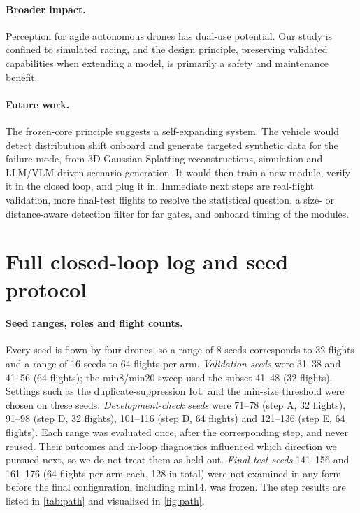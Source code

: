 \documentclass[10pt,twocolumn,letterpaper]{article}
\begin{document}
\paragraph{Broader impact.}
Perception for agile autonomous drones has dual-use potential. Our study is confined to simulated racing, and the design principle, preserving validated capabilities when extending a model, is primarily a safety and maintenance benefit.

\paragraph{Future work.}
The frozen-core principle suggests a self-expanding system. The vehicle would detect distribution shift onboard and generate targeted synthetic data for the failure mode, from 3D Gaussian Splatting reconstructions, simulation and LLM/VLM-driven scenario generation. It would then train a new module, verify it in the closed loop, and plug it in. Immediate next steps are real-flight validation, more final-test flights to resolve the statistical question, a size- or distance-aware detection filter for far gates, and onboard timing of the modules.

{
    \small
    
    
}

\clearpage
\appendix
\section{Full closed-loop log and seed protocol}
\label{sec:app_log}
\paragraph{Seed ranges, roles and flight counts.}
Every seed is flown by four drones, so a range of 8 seeds corresponds to 32 flights and a range of 16 seeds to 64 flights per arm. \emph{Validation seeds} were 31--38 and 41--56 (64 flights); the min8/min20 sweep used the subset 41--48 (32 flights). Settings such as the duplicate-suppression IoU and the min-size threshold were chosen on these seeds. \emph{Development-check seeds} were 71--78 (step A, 32 flights), 91--98 (step D, 32 flights), 101--116 (step D, 64 flights) and 121--136 (step E, 64 flights). Each range was evaluated once, after the corresponding step, and never reused. Their outcomes and in-loop diagnostics influenced which direction we pursued next, so we do not treat them as held out. \emph{Final-test seeds} 141--156 and 161--176 (64 flights per arm each, 128 in total) were not examined in any form before the final configuration, including min14, was frozen. The step results are listed in \cref{tab:path} and visualized in \cref{fig:path}.
\end{document}
